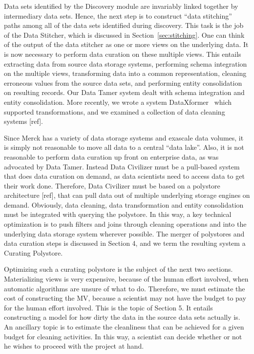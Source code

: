Data sets identified by the Discovery module are invariably linked together by
intermediary data sets.  Hence, the next step is to construct ``data stitching''
paths among all of the data sets identified during discovery.  This task is the
job of the Data Stitcher, which is discussed in Section~\ref{sec:stitching}. One can think of the
output of the data stitcher as one or more views on the underlying data. It is
now necessary to perform data curation on these multiple views.  This entails
extracting data from source data storage systems, performing schema integration
on the multiple views, transforming data into a common representation, cleaning
erroneous values from the source data sets, and performing entity consolidation
on resulting records.  Our Data Tamer system\cite{DBLP:conf/cidr/StonebrakerBIBCZPX13} dealt with schema integration
and entity consolidation.  More recently, we wrote a system DataXformer~\cite{DBLP:conf/icde/AbedjanMIOPS16}
which supported transformations, and we examined a collection of data cleaning
systems [ref].  

Since Merck has a variety of data storage systems and exascale data volumes, it
is simply not reasonable to move all data to a central “data lake”.  Also, it is
not reasonable to perform data curation up front on enterprise data, as was
advocated by Data Tamer.  Instead Data Civilizer must be a pull-based system
that does data curation on demand, as data scientists need to access data to get
their work done.  Therefore, Data Civilizer must be based on a polystore
architecture [ref], that can pull data out of multiple underlying storage
engines on demand.  Obviously, data cleaning, data transformation and entity
consolidation must be integrated with querying the polystore.  In this way, a
key technical optimization is to push filters and joins through cleaning
operations and into the underlying data storage system wherever possible.  The
merger of polystores and data curation steps is discussed in Section 4, and we
term the resulting system a Curating Polystore.  

Optimizing such a curating polystore is the subject of the next two sections.
Materializing views is very expensive, because of the human effort involved,
when automatic algorithms are unsure of what to do.  Therefore, we must estimate
the cost of constructing the MV, because a scientist may not have the budget to
pay for the human effort involved.  This is the topic of Section 5.  It entails
constructing a model for how dirty the data in the source data sets actually is.
An ancillary topic is to estimate the cleanliness that can be achieved for a
given budget for cleaning activities.  In this way, a scientist can decide
whether or not he wishes to proceed with the project at hand.

